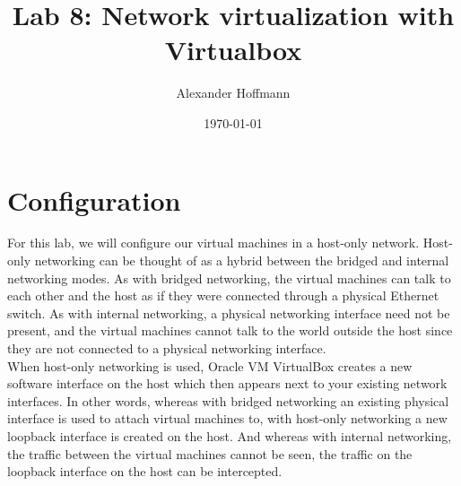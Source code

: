 \documentclass[12pt]{extarticle}
\title{Lab 8: Network virtualization with Virtualbox}
\author{Alexander Hoffmann}
\date{\today}
\begin{document}
\maketitle

\section{Configuration}
For this lab, we will configure our virtual machines in a host-only network. Host-only networking can be thought of as a hybrid between the bridged and internal networking modes. As with bridged networking, the virtual machines can talk to each other and the host as if they were connected through a physical Ethernet switch. As with internal networking, a physical networking interface need not be present, and the virtual machines cannot talk to the world outside the host since they are not connected to a physical networking interface.\\

When host-only networking is used, Oracle VM VirtualBox creates a new software interface on the host which then appears next to your existing network interfaces. In other words, whereas with bridged networking an existing physical interface is used to attach virtual machines to, with host-only networking a new loopback interface is created on the host. And whereas with internal networking, the traffic between the virtual machines cannot be seen, the traffic on the loopback interface on the host can be intercepted.\\
\end{document}
